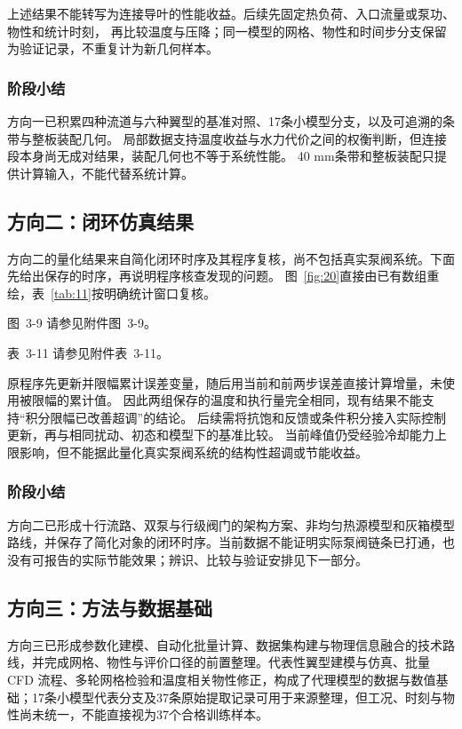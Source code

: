 \documentclass[UTF8]{midterm}
\makeatletter
\newcommand{\submissionnumber}[1]{\def\@currentlabel{#1}}
\makeatother
\begin{document}
上述结果不能转写为连接导叶的性能收益。后续先固定热负荷、入口流量或泵功、物性和统计时刻，
再比较温度与压降；同一模型的网格、物性和时间步分支保留为验证记录，不重复计为新几何样本。

\subsubsection{阶段小结}

方向一已积累四种流道与六种翼型的基准对照、17条小模型分支，以及可追溯的条带与整板装配几何。
局部数据支持温度收益与水力代价之间的权衡判断，但连接段本身尚无成对结果，装配几何也不等于系统性能。
40 mm条带和整板装配只提供计算输入，不能代替系统计算。




\subsection{方向二：闭环仿真结果}
方向二的量化结果来自简化闭环时序及其程序复核，尚不包括真实泵阀系统。下面先给出保存的时序，再说明程序核查发现的问题。
图~\ref{fig:20}直接由已有数组重绘，表~\ref{tab:11}按明确统计窗口复核\cite{stagereports}。


\par\noindent \begingroup\submissionnumber{3-9}\label{fig:20}\endgroup 图~3-9 请参见附件图~3-9。\par



\par\noindent \begingroup\submissionnumber{3-11}\label{tab:11}\endgroup 表~3-11 请参见附件表~3-11。\par

原程序先更新并限幅累计误差变量，随后用当前和前两步误差直接计算增量，未使用被限幅的累计值。
因此两组保存的温度和执行量完全相同，现有结果不能支持“积分限幅已改善超调”的结论。
后续需将抗饱和反馈或条件积分接入实际控制更新，再与相同扰动、初态和模型下的基准比较。
当前峰值仍受经验冷却能力上限影响，但不能据此量化真实泵阀系统的结构性超调或节能收益。

\subsubsection{阶段小结}
方向二已形成十行流路、双泵与行级阀门的架构方案、非均匀热源模型和灰箱模型路线，并保存了简化对象的闭环时序。当前数据不能证明实际泵阀链条已打通，也没有可报告的实际节能效果；辨识、比较与验证安排见下一部分。
\subsection{方向三：方法与数据基础}
方向三已形成参数化建模、自动化批量计算、数据集构建与物理信息融合的技术路线，并完成网格、物性与评价口径的前置整理。代表性翼型建模与仿真、批量 CFD 流程、多轮网格检验和温度相关物性修正，构成了代理模型的数据与数值基础；17条小模型代表分支及37条原始提取记录可用于来源整理，但工况、时刻与物性尚未统一，不能直接视为37个合格训练样本。
\end{document}
